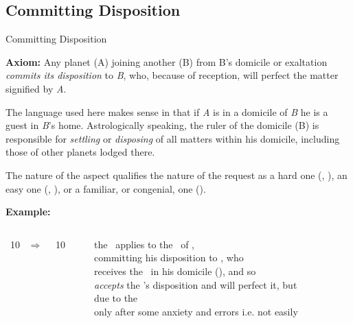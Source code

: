 \subsection{Committing Disposition}
\begin{frame}[t]{Committing Disposition}
\small
\begin{block}{}
\textbf{Axiom:} Any planet (A) joining another (B) from B's domicile or exaltation \textsl{commits its disposition} to \textsl{B}, who, because of reception, will perfect the matter signified by \textsl{A}.
\end{block}

The language used here makes sense in that if \textsl{A} is in a domicile of \textsl{B} he is a guest in \textsl{B}'s home. Astrologically speaking, the ruler of the domicile (B) is responsible for \textsl{settling} or \textsl{disposing} of all matters within his domicile, including those of other planets lodged there.

The nature of the aspect qualifies the nature of the request as a hard one (\Square, \Opposition), an easy one (\Sextile, \Trine), or a familiar, or congenial, one (\Conjunction).

\textbf{Example:}
\begin{columns}[T, onlytextwidth]
\Sun\ 10 \Aries\ $\Rightarrow$ \Square\ \Mars\ 10 \Capricorn

\rule{.1mm}{.27\textheight}

the \Sun\ applies to the \Square\ of \Mars, \\
committing his disposition to \Mars, who  \\
receives the \Sun\ in his domicile (\Aries), and so \\
\textsl{accepts} the \Sun's disposition and will perfect it, but \\
due to the \Square\, \\ 
only after some anxiety and errors i.e. not easily
\end{columns}
\end{frame}
